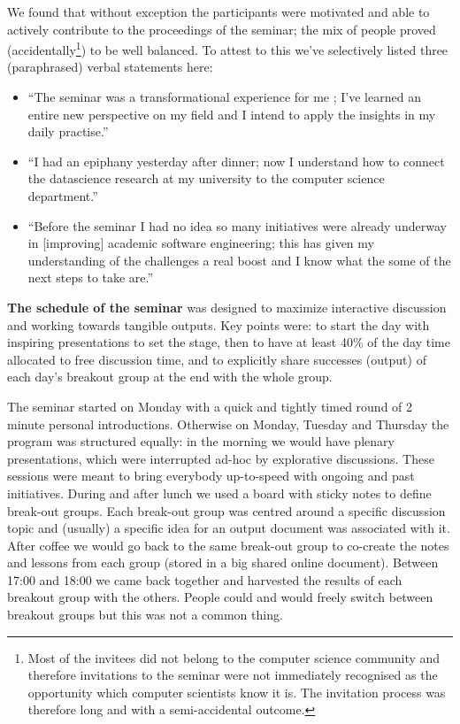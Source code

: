 \documentclass[a4paper,UKenglish]{dagrep}
\begin{document}
We found that without exception the participants were motivated and able to actively contribute to the proceedings of the seminar; the mix of people proved (accidentally\footnote{Most of the invitees did not belong to the computer science community and therefore invitations to the seminar were not immediately recognised as the opportunity which computer scientists know it is. The invitation process was therefore long and with a semi-accidental outcome.}) to be well balanced. To attest to this we've selectively listed three (paraphrased) verbal statements here:
\begin{itemize}
\item ``The seminar was a transformational experience for me	; I've learned an entire new perspective on my field and I intend to apply the insights in my daily practise.''
\item ``I had an epiphany yesterday after dinner; now I understand how to connect the datascience research at my university to the computer science department.''
\item ``Before the seminar I had no idea so many initiatives were already underway in [improving] academic software engineering; this has given my understanding of the challenges a real boost and I know what the some of the next steps to take are.''
\end{itemize}

\textbf{The schedule of the seminar} was designed to maximize interactive discussion and working towards tangible outputs. Key points were: to start the day with inspiring presentations to set the stage, then to have at least 40\% of the day time allocated to free discussion time, and to explicitly share successes (output) of each day's breakout group at the end with the whole group. 

The seminar started on Monday with a quick and tightly timed round of 2 minute personal introductions. Otherwise on Monday, Tuesday and Thursday the program was structured equally: in the morning we would have plenary presentations, which were interrupted ad-hoc by explorative discussions. These sessions were meant to bring everybody up-to-speed with ongoing and past initiatives. During and after lunch we used a board with sticky notes to define break-out groups. Each break-out group was centred around a specific discussion topic and (usually) a specific idea for an output document was associated with it. After coffee we would go back to the same break-out group to co-create the notes and lessons from each group (stored in a big shared online document). Between 17:00 and 18:00 we came back together and harvested the results of each breakout group with the others. People could and would freely switch between breakout groups but this was not a common thing.
\end{document}
